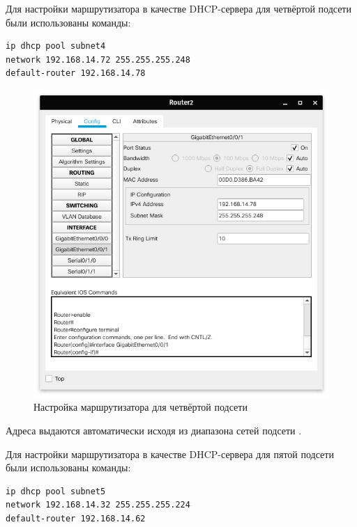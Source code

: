 Для настройки маршрутизатора в качестве DHCP-сервера для четвёртой подсети были использованы команды:
\begin{lstlisting}[caption={Команды для настройки четвёртой подсети}]
ip dhcp pool subnet4
network 192.168.14.72 255.255.255.248
default-router 192.168.14.78
\end{lstlisting}

\begin{figure}[H]
    \centering
    \includegraphics[width=0.8\linewidth]{images/src05.png}
    \caption{Настройка маршрутизатора для четвёртой подсети}%
    \label{fig:servers4}
\end{figure}

Адреса выдаются автоматически исходя из диапазона сетей подсети .

Для настройки маршрутизатора в качестве DHCP-сервера для пятой подсети были использованы команды:
\begin{lstlisting}[caption={Команды для настройки пятой подсети}]
ip dhcp pool subnet5
network 192.168.14.32 255.255.255.224
default-router 192.168.14.62
\end{lstlisting}

